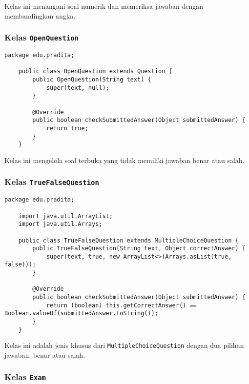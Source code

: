 Kelas ini menangani soal numerik dan memeriksa jawaban dengan membandingkan angka.

\subsubsection{Kelas \texttt{OpenQuestion}}

\begin{lstlisting}[style=JavaStyle]
	package edu.pradita;
	
	public class OpenQuestion extends Question {
		public OpenQuestion(String text) {
			super(text, null);
		}
		
		@Override
		public boolean checkSubmittedAnswer(Object submittedAnswer) {
			return true;
		}
	}
\end{lstlisting}

Kelas ini mengelola soal terbuka yang tidak memiliki jawaban benar atau salah.

\subsubsection{Kelas \texttt{TrueFalseQuestion}}

\begin{lstlisting}[style=JavaStyle]
	package edu.pradita;
	
	import java.util.ArrayList;
	import java.util.Arrays;
	
	public class TrueFalseQuestion extends MultipleChoiceQuestion {
		public TrueFalseQuestion(String text, Object correctAnswer) {
			super(text, true, new ArrayList<>(Arrays.asList(true, false)));
		}
		
		@Override
		public boolean checkSubmittedAnswer(Object submittedAnswer) {
			return (boolean) this.getCorrectAnswer() == Boolean.valueOf(submittedAnswer.toString());
		}
	}
\end{lstlisting}

Kelas ini adalah jenis khusus dari \texttt{MultipleChoiceQuestion} dengan dua pilihan jawaban: benar atau salah.

\subsubsection{Kelas \texttt{Exam}}

